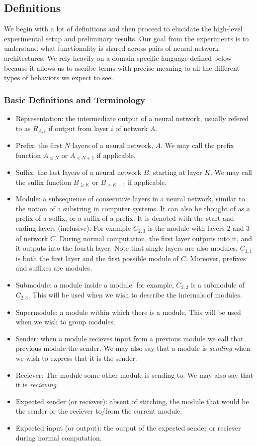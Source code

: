 \documentclass{article} %
\begin{document}
\subsection{Definitions}
We begin with a lot of definitions and then proceed to elucidate the high-level experimental setup
and preliminary results. Our goal from the experiments is to understand what functionality is shared
across pairs of neural network architectures. We rely heavily on a domain-specific language defined
below because it allows us to ascribe terms with precise meaning to all the different types of behaviors
we expect to see.

\subsubsection*{Basic Definitions and Terminology}
\begin{itemize}
   \item Representation: the intermediate output of a neural network, usually refered to as \(R_{A, i}\) if output from layer \(i\) of network \(A\).
   \item Prefix: the first \(N\) layers of a neural network, \(A\). We may call the prefix function \(A_{\leq N}\) or \(A_{<N+1}\) if applicable.
   \item Suffix: the last layers of a neural network \(B\), starting at layer \(K\). We may call the suffix function \(B_{\geq K}\) or \(B_{>K-1}\) if applicable.
   \item Module: a subsequence of consecutive layers in a neural network, similar to the notion of a substring in computer systems. It can also be thought of as a prefix of a suffix, or a suffix of a prefix. It is denoted with the start and ending layers (inclusive). For example \(C_{2,3}\) is the module with layers 2 and 3 of network \(C\). During normal computation, the first layer outputs into it, and it outputs into the fourth layer. Note that single layers are also modules. \(C_{1,1}\) is both the first layer and the first possible module of \(C\). Moreover, prefixes and suffixes are modules.
   \item Submodule: a module inside a module. for example, \(C_{2,2}\) is a submodule of \(C_{2,3}\). This will be used when we wish to describe the internals of modules.
   \item Supermodule: a module within which there is a module. This will be used when we wish to group modules.
   \item Sender: when a module recieves input from a previous module we call that previous module the sender. We may also say that a module is \emph{sending} when we wish to express that it is the sender.
   \item Reciever: The module some other module is sending to. We may also say that it is \emph{recieving}.
   \item Expected sender (or reciever): absent of stitching, the module that would be the sender or the reciever to/from the current module.
   \item Expected input (or output): the output of the expected sender or reciever during normal computation.
\end{itemize}
\end{document}
